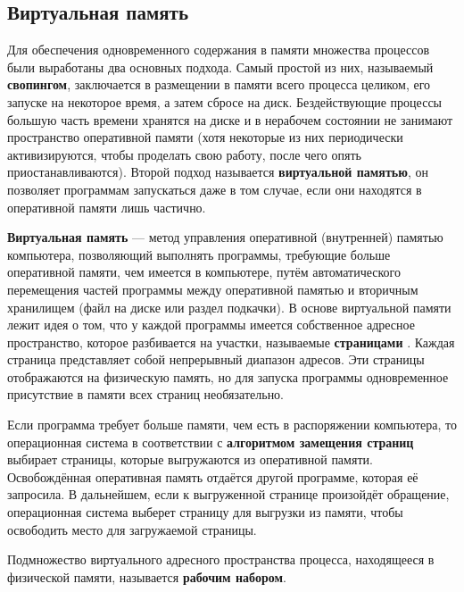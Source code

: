 \subsection{Виртуальная память}

Для обеспечения одновременного содержания в памяти множества процессов были выработаны два основных подхода. Самый простой из них, называемый \textbf{свопингом}, заключается в размещении в памяти всего процесса целиком, его запуске на некоторое время, а затем сбросе на диск. Бездействующие процессы большую часть времени хранятся на диске и в нерабочем состоянии не занимают пространство оперативной памяти (хотя некоторые из них периодически активизируются, чтобы проделать свою работу, после чего опять приостанавливаются). Второй подход называется \textbf{виртуальной памятью}, он позволяет программам запускаться даже в том случае, если они находятся в оперативной памяти лишь частично.

\textbf{Виртуальная память} --- метод управления оперативной (внутренней) памятью компьютера, позволяющий выполнять программы, требующие больше оперативной памяти, чем имеется в компьютере, путём автоматического перемещения частей программы между оперативной памятью и вторичным хранилищем (файл на диске или раздел подкачки). В основе виртуальной памяти лежит идея о том, что у каждой программы имеется собственное адресное пространство, которое разбивается на участки, называемые \textbf{страницами} \cite{tannenbaum}. Каждая страница представляет собой непрерывный диапазон адресов. Эти страницы отображаются на физическую память, но для запуска программы одновременное присутствие в памяти всех страниц необязательно.

Если программа требует больше памяти, чем есть в распоряжении компьютера, то операционная система в соответствии с \textbf{алгоритмом замещения страниц} \cite{tannenbaum} выбирает страницы, которые выгружаются из оперативной памяти. Освобождённая оперативная память отдаётся другой программе, которая её запросила. В дальнейшем, если к выгруженной странице произойдёт обращение, операционная система выберет страницу для выгрузки из памяти, чтобы освободить место для загружаемой страницы.

Подмножество виртуального адресного пространства процесса, находящееся в физической памяти, называется \textbf{рабочим набором}. \cite{windows}


